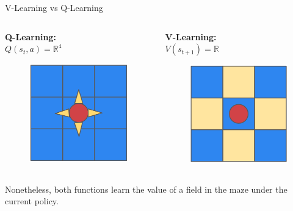 \documentclass[aspectratio=169, 11pt, invertlogo]{ismll-slides}
\begin{document}
\begin{frame}[fragile]{V-Learning vs Q-Learning}
	\begin{columns}
		\begin{column}{.5\linewidth}
			\textbf{Q-Learning:} \\ [1mm]
			$Q(s_t, a) = \mathbb{R}^4$
			\begin{figure}
				\centering
				\includegraphics[width=.5\linewidth]{pics/maze_q}
			\end{figure}
		\end{column}
		\begin{column}{.5\linewidth}
			\textbf{V-Learning:} \\ [1mm]
			$V(s_{t+1}) = \mathbb{R}$
			\begin{figure}
				\centering
				\includegraphics[width=.5\linewidth]{pics/maze_v}
			\end{figure}
		\end{column}
	\end{columns}
	Nonetheless, both functions learn the value of a field in the maze under the current policy. 
\end{frame}

\end{document}
